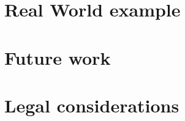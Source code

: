 \documentclass[11pt,a4paper,titlepage]{article}
\begin{document}
    \section{Real World example}
    \section{Future work}
    \section{Legal considerations}
    
    
	\newpage
    
	
    
    
\end{document}
